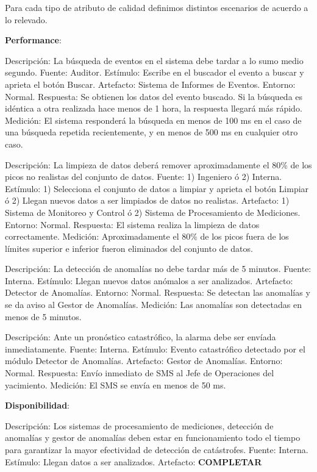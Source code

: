 \documentclass{article}
\theoremstyle{definition}
\theoremstyle{remark}
\begin{document}
Para cada tipo de atributo de calidad definimos distintos escenarios de acuerdo a lo relevado.

\textbf{Performance}:

Descripción: La búsqueda de eventos en el sistema debe tardar a lo sumo medio segundo.
Fuente: Auditor.
Estímulo: Escribe en el buscador el evento a buscar y aprieta el botón Buscar.
Artefacto: Sistema de Informes de Eventos.
Entorno: Normal.
Respuesta: Se obtienen los datos del evento buscado. Si la búsqueda es idéntica a otra realizada hace menos de 1 hora, la respuesta llegará más rápido.
Medición: El sistema responderá la búsqueda en menos de 100 ms en el caso de una búsqueda repetida recientemente, y en menos de 500 ms en cualquier otro caso.

Descripción: La limpieza de datos deberá remover aproximadamente el 80\% de los picos no realistas del conjunto de datos.
Fuente: 1) Ingeniero ó 2) Interna.
Estímulo: 1) Selecciona el conjunto de datos a limpiar y aprieta el botón Limpiar ó 2) Llegan nuevos datos a ser limpiados de datos no realistas.
Artefacto: 1) Sistema de Monitoreo y Control ó 2) Sistema de Procesamiento de Mediciones.
Entorno: Normal.
Respuesta: El sistema realiza la limpieza de datos correctamente.
Medición: Aproximadamente el 80\% de los picos fuera de los límites superior e inferior fueron eliminados del conjunto de datos.

Descripción: La detección de anomalías no debe tardar más de 5 minutos.
Fuente: Interna.
Estímulo: Llegan nuevos datos anómalos a ser analizados.
Artefacto: Detector de Anomalías.
Entorno: Normal.
Respuesta: Se detectan las anomalías y se da aviso al Gestor de Anomalías.
Medición: Las anomalías son detectadas en menos de 5 minutos.

Descripción: Ante un pronóstico catastrófico, la alarma debe ser envíada inmediatamente.
Fuente: Interna.
Estímulo: Evento catastrófico detectado por el módulo Detector de Anomalías.
Artefacto: Gestor de Anomalías.
Entorno: Normal.
Respuesta: Envío inmediato de SMS al Jefe de Operaciones del yacimiento.
Medición: El SMS se envía en menos de 50 ms.

\textbf{Disponibilidad}:

Descripción: Los sistemas de procesamiento de mediciones, detección de anomalías y gestor de anomalías deben estar en funcionamiento todo el tiempo para garantizar la mayor efectividad de detección de catástrofes.
Fuente: Interna.
Estímulo: Llegan datos a ser analizados.
Artefacto: \textbf{COMPLETAR}
\end{document}
